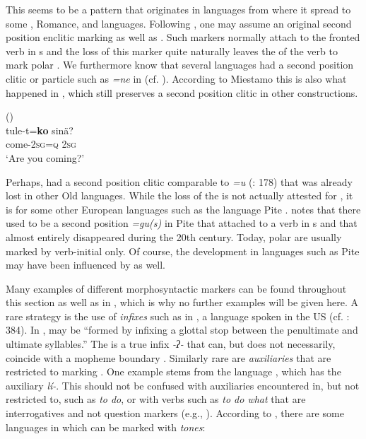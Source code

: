 \noindent This seems to be a pattern that originates in  languages from where it spread to some , Romance, and  languages. Following \citet[12]{Miestamo2011}, one may assume an original second position enclitic marking  as well as . Such markers normally attach to the fronted verb in s and the loss of this marker quite naturally leaves the  of the verb to mark polar . We furthermore know that several  languages had a second position clitic or particle such as \textit{=ne} in  (cf. ). According to Miestamo this is also what happened in , which still preserves a second position clitic in other constructions.

\ea%
    \label{ex:4:12}
     ()\\
    \gll tule-t=\textbf{{ko}} sinä?\\
    come-2\textsc{sg}=\textsc{q}    2\textsc{sg}\\
    \glt ‘Are you coming?’ \citep[12]{Miestamo2011}
    \z

\noindent Perhaps,  had a second position clitic comparable to  \textit{=u} (\citealt{BrauneHeidermanns2004}: 178) that was already lost in other Old  languages. While the loss of the  is not actually attested for , it is for some other European languages such as the  language Pite . \cite[186-187, 244]{Wilbur2014} notes that there used to be a second position  \textit{=gu(s)} in Pite  that attached to a verb in s and that almost entirely disappeared during the 20th century. Today, polar  are usually marked by verb-initial  only. Of course, the development in languages such as Pite  may have been influenced by  as well.

Many examples of different morphosyntactic markers can be found throughout this section as well as in , which is why no further examples will be given here. A rare strategy is the use of \textit{infixes} such as in , a  language spoken in the US (cf. \citealt{Dixon2012}: 384). In ,  may be “formed by infixing a glottal stop between the penultimate and ultimate syllables.” \citep[301]{Kimball1991} The   is a true infix \textit{-ʔ-} that can, but does not necessarily, coincide with a mopheme boundary \citep[302]{Kimball1991}. Similarly rare are \textit{auxiliaries} that are restricted to marking  \citep[4]{Miestamo2011}. One example stems from the  language , which has the auxiliary \textit{lí-}. This should not be confused with auxiliaries encountered in, but not restricted to,  such as  \textit{to do}, or with  verbs such as \textit{to do what} that are interrogatives and not question markers (e.g., \citealt{Hagège2008}). According to \citet[593]{HymanLeben2000}, there are some languages in which  can be marked with \textit{tones}:

